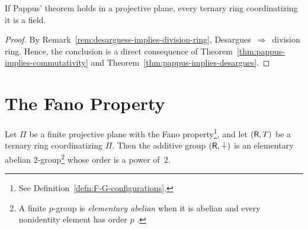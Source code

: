 \begin{cor}\label{cor:pappus-implies-field}
    If Pappus' theorem holds in a projective plane, every ternary ring coordinatizing it is a field.
\end{cor}

\begin{proof}
    By Remark~\ref{rem:desarguess-implies-division-ring},
    Desargues~$\Rightarrow$~division ring. Hence, the conclusion is a direct consequence of Theorem~\ref{thm:pappus-implies-commutativity} and Theorem~\ref{thm:pappus-implies-desargues}.
\end{proof}

\section{The Fano Property}

\begin{thm}\label{thm:elementary-abelian-2-group}
    Let\/ $\Pi$ be a finite projective plane with the Fano property\>\footnote{See Definition~\ref{defn:F-G-configurations}.}, and let\/ $(\mathsf R,T)$ be a ternary ring coordinatizing\/ $\Pi$. Then the additive group\/ $(\mathsf R,\dotplus)$ is an elementary abelian\/ $2$-group\>\footnote{A finite $p$-group is \textsl{elementary abelian} when it is abelian and every nonidentity element has order $p$ \citep{LC-Groups}.} whose order is a power of\/~$2$.
\end{thm}

